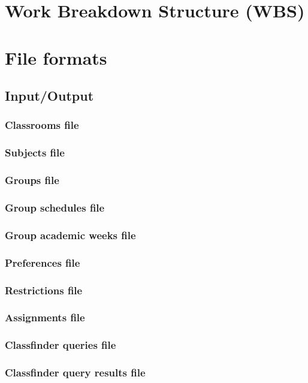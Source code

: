 \section{Work Breakdown Structure (WBS)}



\section{File formats}


\subsection{Input/Output}

\subsubsection{Classrooms file}
\subsubsection{Subjects file}
\subsubsection{Groups file}
\subsubsection{Group schedules file}
\subsubsection{Group academic weeks file}
\subsubsection{Preferences file}
\subsubsection{Restrictions file}
\subsubsection{Assignments file}
\subsubsection{Classfinder queries file}
\subsubsection{Classfinder query results file}
